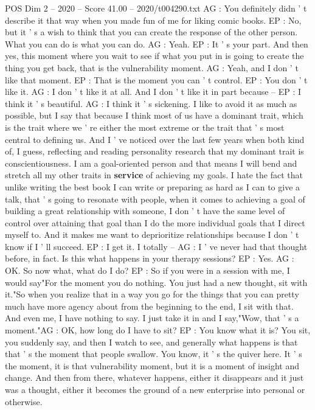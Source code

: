 \begin{textsample}{POS Dim 2 – 2020 – Score 41.00 – 2020/t004290.txt}
AG : You definitely didn ' t describe it that way when you made fun of me for liking comic books.
EP : No, but it ' s a wish to think that you can create the response of the other person.
What you can do is what you can do.
AG : Yeah.
EP : It ' s your part.
And then yes, this moment where you wait to see if what you put in is going to create the thing you get back, that is the vulnerability moment.
AG : Yeah, and I don ' t like that moment.
EP : That is the moment you can ' t control.
EP : You don ' t like it.
AG : I don ' t like it at all.
And I don ' t like it in part because -- EP : I think it ' s beautiful.
AG : I think it ' s sickening.
I like to avoid it as much as possible, but I say that because I think most of us have a dominant trait, which is the trait where we ' re either the most extreme or the trait that ' s most central to defining us.
And I ' ve noticed over the last few years when both kind of, I guess, reflecting and reading personality research that my dominant trait is conscientiousness.
I am a goal-oriented person and that means I will bend and stretch all my other traits in \textbf{service} of achieving my goals.
I hate the fact that unlike writing the best book I can write or preparing as hard as I can to give a talk, that ' s going to resonate with people, when it comes to achieving a goal of building a great relationship with someone, I don ' t have the same level of control over attaining that goal than I do the more individual goals that I direct myself to.
And it makes me want to deprioritize relationships because I don ' t know if I ' ll succeed.
EP : I get it.
I totally -- AG : I ' ve never had that thought before, in fact.
Is this what happens in your therapy sessions?
EP : Yes.
AG : OK.
So now what, what do I do?
EP : So if you were in a session with me, I would say"For the moment you do nothing.
You just had a new thought, sit with it."So when you realize that in a way you go for the things that you can pretty much have more agency about from the beginning to the end, I sit with that.
And even me, I have nothing to say.
I just take it in and I say,"Wow, that ' s a moment."AG : OK, how long do I have to sit?
EP : You know what it is?
You sit, you suddenly say, and then I watch to see, and generally what happens is that that ' s the moment that people swallow.
You know, it ' s the quiver here.
It ' s the moment, it is that vulnerability moment, but it is a moment of insight and change.
And then from there, whatever happens, either it disappears and it just was a thought, either it becomes the ground of a new enterprise into personal or otherwise.

\end{textsample}
